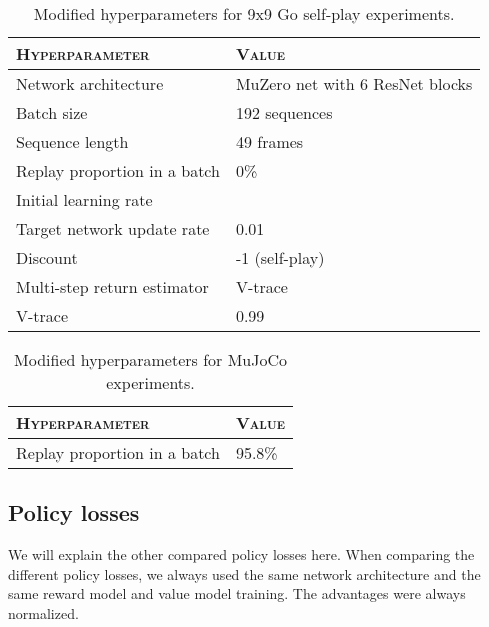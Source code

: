 \documentclass{article}
\begin{document}
\begin{table}[ht]
\caption{Modified hyperparameters for 9x9 Go self-play experiments.}
\label{tab:go_hyperparams}
\begin{center}
\begin{small}
\begin{tabular}{ll}
\toprule
\textsc{Hyperparameter} & \textsc{Value} \\
\midrule
  Network architecture & MuZero net with 6 ResNet blocks  \\
  Batch size & 192 sequences \\  Sequence length & 49 frames \\
  Replay proportion in a batch & 0\% \\
  Initial learning rate &  \\ 
  Target network update rate  & 0.01 \\
  Discount & -1 (self-play) \\
  Multi-step return estimator & V-trace \\
  V-trace  & 0.99 \\
\bottomrule
\end{tabular}
\end{small}
\end{center}
\vskip -0.1in
\end{table} 

\begin{table}[ht]
\caption{Modified hyperparameters for MuJoCo experiments.}
\label{tab:mujoco_hyperparams}
\begin{center}
\begin{small}
\begin{tabular}{ll}
\toprule
\textsc{Hyperparameter} & \textsc{Value} \\
\midrule
  Replay proportion in a batch & 95.8\% \\
\bottomrule
\end{tabular}
\end{small}
\end{center}
\vskip -0.1in
\end{table}  

  
\subsection{Policy losses}
We will explain the other compared policy losses here.
When comparing the different policy losses, we always used the same network architecture and the same reward model and value model training. The advantages were always normalized.
\end{document}
